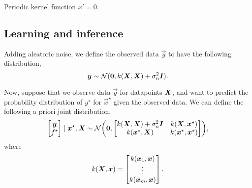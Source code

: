 \begin{marginfigure}
    \caption{Periodic kernel function \wrt $x'=0$.}
    \label{fig:gp-per-kernel}
\end{marginfigure}

\subsection{Learning and inference}

Adding aleatoric noise, we define the observed data $\vec{y}$ to have the
following distribution, \[
  \bm{y} \sim \mathcal{N}(\bm{0}, k(\bm{X}, \bm{X}) + \sigma_n^2\bm{I})
.\]

Now, suppose that we observe data $\vec{y}$ for datapoints $\bm{X}$, and want
to predict the probability distribution of $y^\star$ for $\vec{x}^\star$ given
the observed data. We can define the following a priori joint
distribution, \[
  \begin{bmatrix}
    \vec{y} \\
    f^\star
  \end{bmatrix} \mid \vec{x}^\star, \vec{X}
  \sim
  \mathcal{N} \lft(
  \vec{0},
  \begin{bmatrix}
    k(\mat{X},\mat{X}) + \sigma_n^2\mat{I} & k(\mat{X},\vec{x}^\star) \\
    k(\vec{x}^\star,\mat{X}) & k(\vec{x}^\star, \vec{x}^\star)
  \end{bmatrix} \rgt)
,\]
where \[
  k(\bm{X},\bm{x}) = \begin{bmatrix} k(\bm{x}_1,\bm{x}) \\ \vdots \\
  k(\bm{x}_m,\bm{x}) \end{bmatrix}
.\]

